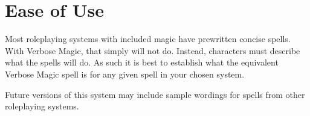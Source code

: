 \section{Ease of Use}
Most roleplaying systems with included magic have prewritten concise spells.
With Verbose Magic, that simply will not do.
Instead, characters must describe what the spells will do.
As such it is best to establish what the equivalent Verbose Magic spell is for any given spell in your chosen system.

\begin{rpg-commentbox}
	Future versions of this system may include sample wordings for spells from other roleplaying systems.
\end{rpg-commentbox}

%
%
%
%
%
%
%
%
